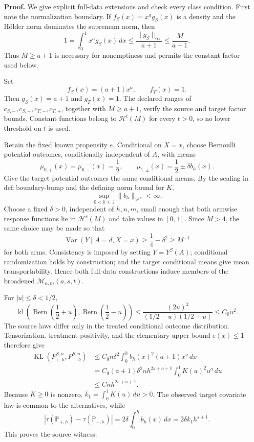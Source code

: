 \textbf{Proof.}
We give explicit full-data extensions and check every class condition. First note the normalization boundary. If \(f_S(x)=x^ag_S(x)\) is a density and the Hölder norm dominates the supremum norm, then
\[
1=\int_0^1x^ag_S(x)\,dx
\le \frac{\lVert g_S\rVert_\infty}{a+1}
\le \frac{M}{a+1}.
\]
Thus \(M\ge a+1\) is necessary for nonemptiness and permits the constant factor used below.

Set
\[
f_S(x)=(a+1)x^a,
\qquad
f_T(x)=1.
\]
Then \(g_S(x)=a+1\) and \(g_T(x)=1\). The declared ranges of \(c_{S,-},c_{S,+},c_{T,-},c_{T,+}\), together with \(M\ge a+1\), verify the source and target factor bounds. Constant functions belong to \(\mathcal H^t(M)\) for every \(t>0\), so no lower threshold on \(t\) is used.

Retain the fixed known propensity \(e\). Conditional on \(X=x\), choose Bernoulli potential outcomes, conditionally independent of \(A\), with means
\[
\mu_{0,+}(x)=\mu_{0,-}(x)=\frac12,
\qquad
\mu_{1,\pm}(x)=\frac12\pm\delta b_h(x).
\]
Give the target potential outcomes the same conditional means. By the scaling in \(\mathrm{def:boundary\text{-}bump}\) and the defining norm bound for \(K\),
\[
\sup_{0<h\le1}\lVert b_h\rVert_{\mathcal H^s}<\infty.
\]
Choose a fixed \(\delta>0\), independent of \(h,n,m\), small enough that both armwise response functions lie in \(\mathcal H^s(M)\) and take values in \([0,1]\). Since \(M>4\), the same choice may be made so that
\[
\operatorname{Var}(Y\mid A=d,X=x)
\ge \frac14-\delta^2
\ge M^{-1}
\]
for both arms. Consistency is imposed by setting \(Y=Y^S(A)\); conditional randomization holds by construction; and the target conditional means give mean transportability. Hence both full-data constructions induce members of the broadened \(\mathcal M_{n,m}(a,s,t)\).

For \(|u|\le\delta<1/2\),
\[
\operatorname{kl}\!\left(\operatorname{Bern}\!\left(\frac12+u\right),
\operatorname{Bern}\!\left(\frac12-u\right)\right)
\le \frac{(2u)^2}{(1/2-u)(1/2+u)}
\le C_0u^2.
\]
The source laws differ only in the treated conditional outcome distribution. Tensorization, treatment positivity, and the elementary upper bound \(e(x)\le1\) therefore give
\[
\begin{aligned}
\operatorname{KL}(P_{+,h}^{S,n},P_{-,h}^{S,n})
&\le C_0n\delta^2\int_0^hb_h(x)^2(a+1)x^a\,dx\\
&=C_0(a+1)\delta^2nh^{2s+a+1}
\int_0^1K(u)^2u^a\,du\\
&\le Cnh^{2s+a+1}.
\end{aligned}
\]
Because \(K\ge0\) is nonzero, \(k_1=\int_0^1K(u)\,du>0\). The observed target covariate law is common to the alternatives, while
\[
\left|\tau(\mathbb P_{+,h})-\tau(\mathbb P_{-,h})\right|
=2\delta\int_0^hb_h(x)\,dx
=2\delta k_1h^{s+1}.
\]
This proves the source witness.

